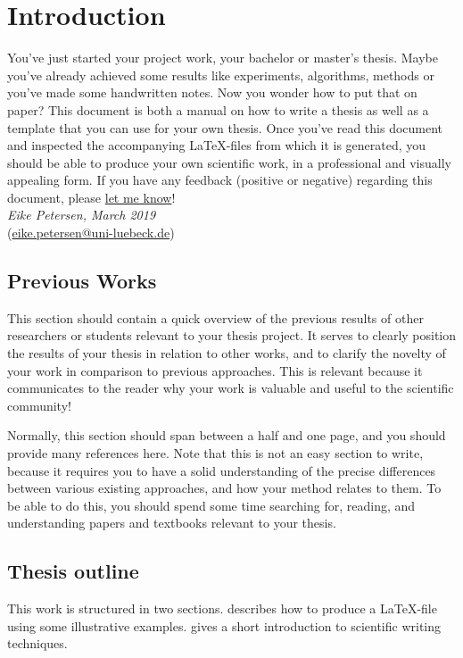 \chapter{Introduction}
\label{chap:intro}

You've just started your project work, your bachelor or master's thesis. 
Maybe you've already achieved some results like experiments, algorithms, methods or you've made some handwritten notes. 
Now you wonder how to put that on paper?
This document is both a manual on how to write a thesis as well as a template that you can use for your own thesis.
Once you've read this document and inspected the accompanying \LaTeX-files from which it is generated, you should be able to produce your own scientific work, in a professional and visually appealing form.
If you have any feedback (positive or negative) regarding this document, please \href{mailto:eike.petersen@uni-luebeck.de}{let me know}!
\\

\noindent\emph{Eike Petersen, March 2019}\\
\noindent(\href{mailto:eike.petersen@uni-luebeck.de}{eike.petersen@uni-luebeck.de})


\section{Previous Works}
This section should contain a quick overview of the previous results of other researchers or students relevant to your thesis project.
It serves to clearly position the results of your thesis in relation to other works, and to clarify the novelty of your work in comparison to previous approaches.
This is relevant because it communicates to the reader why your work is valuable and useful to the scientific community!

Normally, this section should span between a half and one page, and you should provide many references here.
Note that this is not an easy section to write, because it requires you to have a solid understanding of the precise differences between various existing approaches, and how your method relates to them.
To be able to do this, you should spend some time searching for, reading, and understanding papers and textbooks relevant to your thesis.

\section{Thesis outline}
This work is structured in two sections. 
 describes how to produce a \LaTeX-file using some illustrative examples. 
 gives a short introduction to scientific writing techniques.


